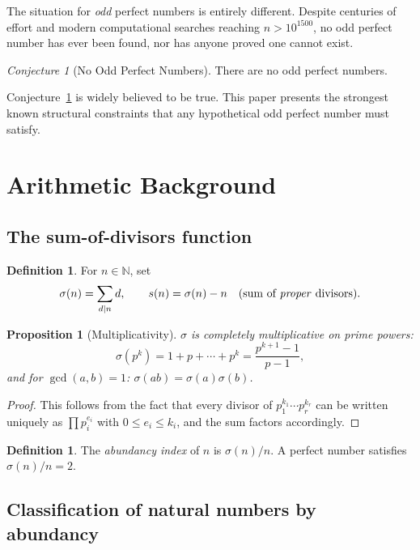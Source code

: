 \documentclass[12pt,a4paper]{amsart}
\newtheorem{proposition}[theorem]{Proposition}
\theoremstyle{definition}
\newtheorem{definition}[theorem]{Definition}
\theoremstyle{remark}
\newtheorem{conjecture}[theorem]{Conjecture}
\newcommand{\N}{\mathbb{N}}
\begin{document}
The situation for \emph{odd} perfect numbers is entirely different.
Despite centuries of effort and modern computational searches reaching
$n > 10^{1500}$, no odd perfect number has ever been found, nor has anyone
proved one cannot exist.

\begin{conjecture}[No Odd Perfect Numbers]
\label{conj:nopn}
There are no odd perfect numbers.
\end{conjecture}

Conjecture~\ref{conj:nopn} is widely believed to be true.
This paper presents the strongest known structural constraints that any
hypothetical odd perfect number must satisfy.

\section{Arithmetic Background}

\subsection{The sum-of-divisors function}

\begin{definition}
For $n \in \N$, set
\[
  \sigma(n) = \sum_{d \mid n} d, \qquad
  s(n) = \sigma(n) - n \quad (\text{sum of \emph{proper} divisors}).
\]
\end{definition}

\begin{proposition}[Multiplicativity]
$\sigma$ is completely multiplicative on prime powers:
\[
  \sigma(p^k) = 1 + p + \cdots + p^k = \frac{p^{k+1}-1}{p-1},
\]
and for $\gcd(a,b)=1$: $\sigma(ab) = \sigma(a)\sigma(b)$.
\end{proposition}

\begin{proof}
This follows from the fact that every divisor of $p_1^{k_1}\cdots p_r^{k_r}$
can be written uniquely as $\prod p_i^{e_i}$ with $0 \leq e_i \leq k_i$,
and the sum factors accordingly.
\end{proof}

\begin{definition}
The \emph{abundancy index} of $n$ is $\sigma(n)/n$.
A perfect number satisfies $\sigma(n)/n = 2$.
\end{definition}

\subsection{Classification of natural numbers by abundancy}
\end{document}
